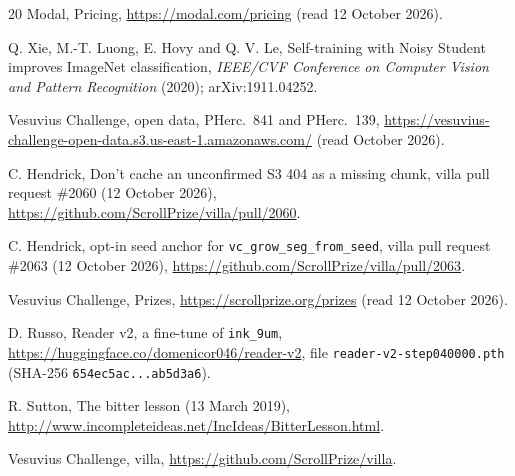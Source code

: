 \documentclass[11pt]{article}
\begin{document}
\begin{thebibliography}{20}
 Modal, Pricing, \url{https://modal.com/pricing} (read 12 October 2026).

 Q. Xie, M.-T. Luong, E. Hovy and Q. V. Le, Self-training with Noisy Student improves ImageNet classification, \emph{IEEE/CVF Conference on Computer Vision and Pattern Recognition} (2020); arXiv:1911.04252.

 Vesuvius Challenge, open data, PHerc.~841 and PHerc.~139, \url{https://vesuvius-challenge-open-data.s3.us-east-1.amazonaws.com/} (read October 2026).

 C. Hendrick, Don't cache an unconfirmed S3 404 as a missing chunk, villa pull request \#2060 (12 October 2026), \url{https://github.com/ScrollPrize/villa/pull/2060}.

 C. Hendrick, opt-in seed anchor for \texttt{vc\_grow\_seg\_from\_seed}, villa pull request \#2063 (12 October 2026), \url{https://github.com/ScrollPrize/villa/pull/2063}.

 Vesuvius Challenge, Prizes, \url{https://scrollprize.org/prizes} (read 12 October 2026).

 D. Russo, Reader v2, a fine-tune of \texttt{ink\_9um}, \url{https://huggingface.co/domenicor046/reader-v2}, file \texttt{reader-v2-step040000.pth} (SHA-256 \texttt{654ec5ac...ab5d3a6}).

 R. Sutton, The bitter lesson (13 March 2019), \url{http://www.incompleteideas.net/IncIdeas/BitterLesson.html}.

 Vesuvius Challenge, villa, \url{https://github.com/ScrollPrize/villa}.

\end{thebibliography}
\end{document}
